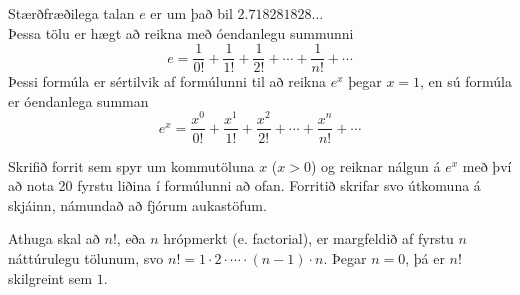 \begin{problem}
	Stærðfræðilega talan $e$ er um það bil $2.718281828\ldots$\\
	Þessa tölu er hægt að reikna með óendanlegu summunni $$e = \frac{1}{0!} + \frac{1}{1!} + \frac{1}{2!} + \dotsm + \frac{1}{n!} + \dotsm$$
	Þessi formúla er sértilvik af formúlunni til að reikna $e^x$ þegar $x = 1$, en sú formúla er óendanlega summan $$e^x = \frac{x^0}{0!} + \frac{x^1}{1!} + \frac{x^2}{2!} + \dotsm + \frac{x^n}{n!} + \dotsm$$

	Skrifið forrit sem spyr um kommutöluna $x$ ($x > 0$) og reiknar nálgun á $e^x$ með því að nota 20 fyrstu liðina í formúlunni að ofan. Forritið skrifar svo útkomuna á skjáinn, námundað að fjórum aukastöfum.

	Athuga skal að $n!$, eða $n$ hrópmerkt (e. factorial), er margfeldið af fyrstu $n$ náttúrulegu tölunum, svo $n! = 1\cdot 2\cdot \dotsm \cdot (n-1) \cdot n$. Þegar $n=0$, þá er $n!$ skilgreint sem $1$.

\begin{example}
%
\end{example}
\begin{example}
%
\end{example}
\begin{example}
%
\end{example}
\end{problem}